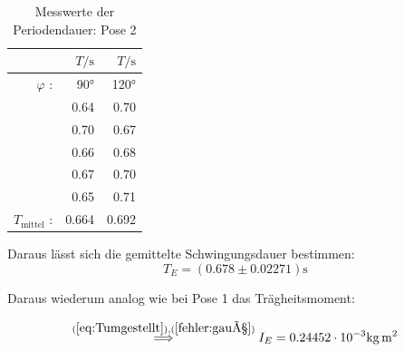 \begin{table}
  \centering
  \caption{Messwerte der Periodendauer: Pose 2}
  \label{tab:PeriodendauerPose2}
  \begin{tabular}{rrr}
    \toprule
    & $T / \unit\second$ &  $T / \unit\second$  \\
    \midrule
    $\varphi$ : & 90° & 120° \\
    \midrule
          & 0.64 &        0.70 \\
          & 0.70 &        0.67 \\
          & 0.66 &        0.68 \\
          & 0.67 &        0.70 \\
          & 0.65 &        0.71 \\
    \midrule
    $T_{\text{mittel}}$ : & 0.664 & 0.692 \\
    \bottomrule
    \end{tabular}
\end{table}

Daraus lässt sich die gemittelte Schwingungsdauer bestimmen:
\begin{equation*}
  T_E = (0.678 \pm 0.02271) \unit\second
\end{equation*}

Daraus wiederum analog wie bei Pose 1 das Trägheitsmoment:

\begin{equation*}
  \stackrel{(\ref{eq:Tumgestellt}),(\ref{fehler:gauß})}{\implies} I_E = 0.24452  \cdot 10^{-3} %
  \unit{\kilo\gram\meter\squared} %
\end{equation*}
